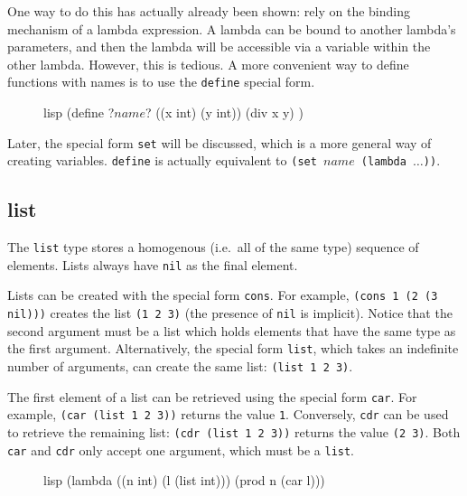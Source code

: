 One way to do this has actually already been shown: rely on the binding mechanism of a lambda expression. A lambda can be bound to another lambda's parameters, and then the lambda will be accessible via a variable within the other lambda. However, this is tedious. A more convenient way to define functions with names is to use the \texttt{define} special form.

\begin{figure}[htp]
    \centering
    \begin{cminted}[autogobble=true, escapeinside=??]{lisp}
        (define ?$name$? ((x int) (y int))
          (div x y)
        )
    \end{cminted}
    \captionsetup[figure]{font=small}
\end{figure}

Later, the special form \texttt{set} will be discussed, which is a more general way of creating variables. \texttt{define} is actually equivalent to \texttt{(set $name$ (lambda $\ldots$))}.

\subsection{list}
The \texttt{list} type stores a homogenous (i.e.\ all of the same type) sequence of elements. Lists always have \texttt{nil} as the final element.

Lists can be created with the special form \texttt{cons}. For example, \texttt{(cons 1 (2 (3 nil)))} creates the list \texttt{(1 2 3)} (the presence of \texttt{nil} is implicit). Notice that the second argument must be a list which holds elements that have the same type as the first argument. Alternatively, the special form \texttt{list}, which takes an indefinite number of arguments, can create the same list: \texttt{(list 1 2 3)}.

The first element of a list can be retrieved using the special form \texttt{car}. For example, \texttt{(car (list 1 2 3))} returns the value \texttt{1}. Conversely, \texttt{cdr} can be used to retrieve the remaining list: \texttt{(cdr (list 1 2 3))} returns the value \texttt{(2 3)}. Both \texttt{car} and \texttt{cdr} only accept one argument, which must be a \texttt{list}.

\begin{figure}[htp]
    \centering
    \begin{cminted}[autogobble=true]{lisp}
        (lambda ((n int) (l (list int)))
          (prod n (car l)))
    \end{cminted}
    \captionsetup[figure]{font=small}
\end{figure}

